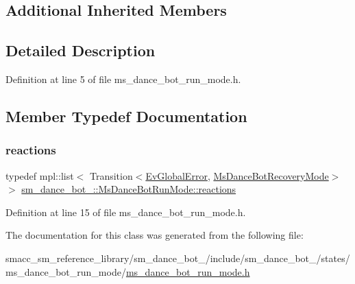 \subsection*{Additional Inherited Members}


\subsection{Detailed Description}


Definition at line 5 of file ms\+\_\+dance\+\_\+bot\+\_\+run\+\_\+mode.\+h.



\subsection{Member Typedef Documentation}
\mbox{\label{classsm__dance__bot__2_1_1MsDanceBotRunMode_a66cf5d65e04e52d64e448310e4677ede}} 
\subsubsection{\texorpdfstring{reactions}{reactions}}
{\footnotesize\ttfamily typedef mpl\+::list$<$ Transition$<$\hyperlink{structsm__dance__bot__2_1_1EvGlobalError}{Ev\+Global\+Error}, \hyperlink{classsm__dance__bot__2_1_1MsDanceBotRecoveryMode}{Ms\+Dance\+Bot\+Recovery\+Mode}$>$ $>$ \hyperlink{classsm__dance__bot__2_1_1MsDanceBotRunMode_a66cf5d65e04e52d64e448310e4677ede}{sm\+\_\+dance\+\_\+bot\+\_\+::\+Ms\+Dance\+Bot\+Run\+Mode\+::reactions}}



Definition at line 15 of file ms\+\_\+dance\+\_\+bot\+\_\+run\+\_\+mode.\+h.



The documentation for this class was generated from the following file\+:\begin{DoxyCompactItemize}
\item 
smacc\+\_\+sm\+\_\+reference\+\_\+library/sm\+\_\+dance\+\_\+bot\+\_/include/sm\+\_\+dance\+\_\+bot\+\_/states/ms\+\_\+dance\+\_\+bot\+\_\+run\+\_\+mode/\hyperlink{sm__dance__bot__2_2include_2sm__dance__bot__2_2states_2ms__dance__bot__run__mode_2ms__dance__bot__run__mode_8h}{ms\+\_\+dance\+\_\+bot\+\_\+run\+\_\+mode.\+h}\end{DoxyCompactItemize}
